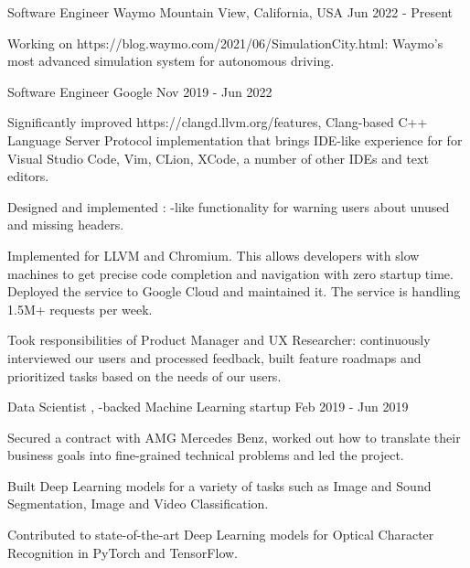 
\begin{cventries}

  \cventry
    {Software Engineer}
    {Waymo}
    {Mountain View, California, USA}
    {Jun 2022 - Present}
    {
      \begin{cvitems}
        \item Working on 
	{https://blog.waymo.com/2021/06/SimulationCity.html}: Waymo's most
        advanced simulation system for autonomous driving.
      \end{cvitems}
    }

  \cventry
    {Software Engineer}
    {Google}
    {}
    {Nov 2019 - Jun 2022}
    {
      \begin{cvitems}
        \item Significantly improved 
	  {https://clangd.llvm.org/features}, Clang-based C++ Language
	  Server Protocol implementation that brings IDE-like experience for
	  for Visual Studio Code, Vim, CLion, XCode, a number of
	  other IDEs and text editors.
        \item Designed and implemented : -like functionality for warning users about unused and
          missing headers.
        \item Implemented  for LLVM and Chromium. This
          allows developers with slow machines to get precise code completion
          and navigation with zero startup time. Deployed the service to Google
	  Cloud and maintained it. The service is handling 1.5M+ requests
          per week.
        \item Took responsibilities of Product Manager and UX Researcher:
          continuously interviewed our users and processed feedback, built
          feature roadmaps and prioritized tasks based on the needs of our
          users.
      \end{cvitems}
    }

  \cventry
    {Data Scientist}
    {,
     -backed Machine Learning
     startup}
    {}
    {Feb 2019 - Jun 2019}
    {
      \begin{cvitems}
        \item Secured a contract with AMG Mercedes Benz, worked out how to
          translate their business goals into fine-grained technical problems
          and led the project.
        \item Built Deep Learning models for a variety of tasks such as Image
	  and Sound Segmentation, Image and Video Classification.
        \item Contributed to state-of-the-art Deep Learning models for Optical
          Character Recognition in PyTorch and TensorFlow.
      \end{cvitems}
    }


\end{cventries}
